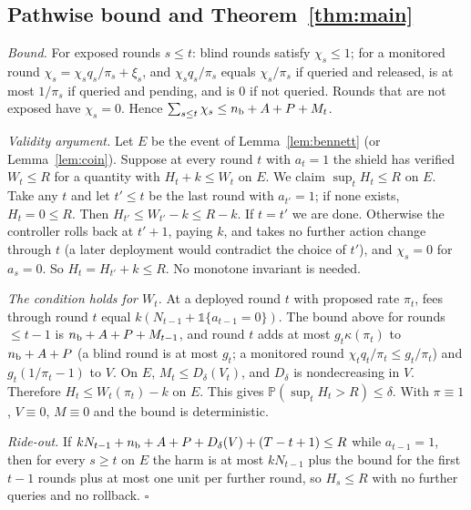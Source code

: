 \documentclass{article}
\theoremstyle{plain}
\theoremstyle{definition}
\newcommand{\PP}{\mathbb{P}}
\newcommand{\one}{\mathbb{1}}
\begin{document}
\subsection{Pathwise bound and Theorem~\ref{thm:main}}
\emph{Bound.} For exposed rounds $s\le t$: blind rounds satisfy $\chi_s\le1$; for a monitored round $\chi_s=\chi_sq_s/\pi_s+\xi_s$, and $\chi_sq_s/\pi_s$ equals $\chi_s/\pi_s$ if queried and released, is at most $1/\pi_s$ if queried and pending, and is $0$ if not queried. Rounds that are not exposed have $\chi_s=0$. Hence $\sum_{s\le t}\chi_s\le n_{\rm b}+A+P+M_t$.

\emph{Validity argument.} Let $E$ be the event of Lemma~\ref{lem:bennett} (or Lemma~\ref{lem:coin}). Suppose at every round $t$ with $a_t=1$ the shield has verified $W_t\le R$ for a quantity with $H_t+k\le W_t$ on $E$. We claim $\sup_tH_t\le R$ on $E$. Take any $t$ and let $t'\le t$ be the last round with $a_{t'}=1$; if none exists, $H_t=0\le R$. Then $H_{t'}\le W_{t'}-k\le R-k$. If $t=t'$ we are done. Otherwise the controller rolls back at $t'+1$, paying $k$, and takes no further action change through $t$ (a later deployment would contradict the choice of $t'$), and $\chi_s=0$ for $a_s=0$. So $H_t=H_{t'}+k\le R$. No monotone invariant is needed.

\emph{The condition holds for $W_t$.} At a deployed round $t$ with proposed rate $\pi_t$, fees through round $t$ equal $k(N_{t-1}+\one\{a_{t-1}=0\})$. The bound above for rounds $\le t-1$ is $n_{\rm b}+A+P+M_{t-1}$, and round $t$ adds at most $g_t\kappa(\pi_t)$ to $n_{\rm b}+A+P$ (a blind round is at most $g_t$; a monitored round $\chi_t q_t/\pi_t\le g_t/\pi_t$) and $g_t(1/\pi_t-1)$ to $V$. On $E$, $M_t\le D_\delta(V_t)$, and $D_\delta$ is nondecreasing in $V$. Therefore $H_t\le W_t(\pi_t)-k$ on $E$. This gives $\PP(\sup_tH_t>R)\le\delta$. With $\pi\equiv1$, $V\equiv0$, $M\equiv0$ and the bound is deterministic.

\emph{Ride-out.} If $kN_{t-1}+n_{\rm b}+A+P+D_\delta(V)+(T-t+1)\le R$ while $a_{t-1}=1$, then for every $s\ge t$ on $E$ the harm is at most $kN_{t-1}$ plus the bound for the first $t-1$ rounds plus at most one unit per further round, so $H_s\le R$ with no further queries and no rollback. $\square$
\end{document}
